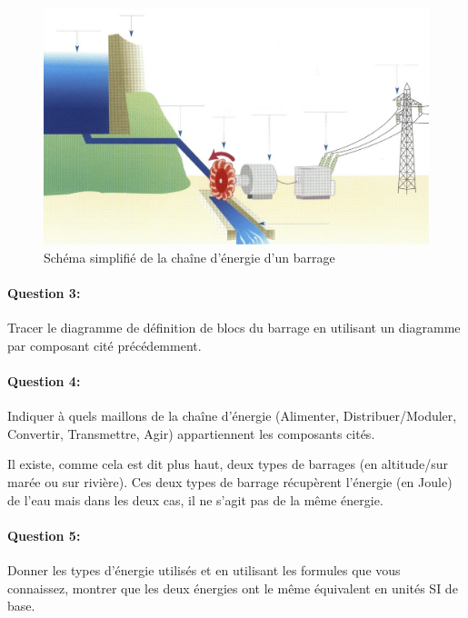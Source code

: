 \begin{figure}[htbp]
\begin{center}
\includegraphics[width=0.9\linewidth]{img/schema_barrage.jpg}
\caption{Schéma simplifié de la chaîne d'énergie d'un barrage}
\label{fig:image6}
\end{center}
\end{figure}


\paragraph{Question 3:}

Tracer le diagramme de définition de blocs du barrage en utilisant un diagramme par composant cité précédemment.

\paragraph{Question 4:}

Indiquer à quels maillons de la chaîne d'énergie (Alimenter, Distribuer/Moduler, Convertir, Transmettre, Agir) appartiennent les composants cités.

Il existe, comme cela est dit plus haut, deux types de barrages (en altitude/sur marée ou sur rivière). Ces deux types de barrage récupèrent l'énergie (en Joule) de l'eau mais dans les deux cas, il ne s'agit pas de la même énergie.

\paragraph{Question 5:}

Donner les types d'énergie utilisés et en utilisant les formules que vous connaissez, montrer que les deux énergies ont le même équivalent en unités SI de base.

